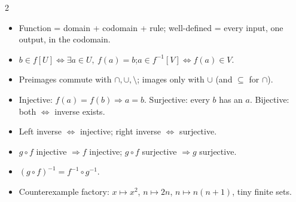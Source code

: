 
\begin{multicols}{2}\small
\begin{itemize}
\item Function = domain + codomain + rule; well-defined = every input, one output, in the codomain.
\item $b\in f[U]\Leftrightarrow\exists a\in U,\ f(a)=b$;\quad $a\in f^{-1}[V]\Leftrightarrow f(a)\in V$.
\item Preimages commute with $\cap,\cup,\setminus$; images only with $\cup$ (and $\subseteq$ for $\cap$).
\item Injective: $f(a)=f(b)\Rightarrow a=b$. Surjective: every $b$ has an $a$. Bijective: both $\Leftrightarrow$ inverse exists.
\item Left inverse $\Leftrightarrow$ injective; right inverse $\Leftrightarrow$ surjective.
\item $g\circ f$ injective $\Rightarrow f$ injective; $g\circ f$ surjective $\Rightarrow g$ surjective.
\item $(g\circ f)^{-1}=f^{-1}\circ g^{-1}$.
\item Counterexample factory: $x\mapsto x^2$, $n\mapsto 2n$, $n\mapsto n(n+1)$, tiny finite sets.
\end{itemize}
\end{multicols}
